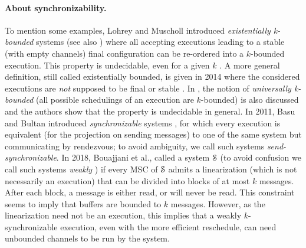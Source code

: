 \documentclass[a4paper,UKenglish,cleveref, autoref, thm-restate]{lipics-v2021}
\begin{document}
\paragraph*{About synchronizability.}
To mention some examples, Lohrey and Mus\-choll introduced
\emph{existentially k-bounded} systems \cite{DBLP:journals/iandc/LohreyM04} (see
also \cite{DBLP:conf/fossacs/LohreyM02,DBLP:conf/dlt/GenestMK04,GKM07}) where
all accepting executions leading to a stable (with empty channels) final
configuration can be re-ordered into a $k$-bounded execution. This property is
undecidable, even for a given $k$ \cite{GKM07}. A  more general definition,
still called existentially bounded, is given in 2014 where the considered
executions are \emph{not} supposed to be final or stable
\cite{kuske2014communicating}. In  \cite{DBLP:journals/iandc/LohreyM04,HENRIKSEN20051}, the notion of
\emph{universally k-bounded} (all possible schedulings of an execution are $k$-bounded) is also
discussed and the authors show that the property is undecidable in
general.
%
In 2011, Basu and Bultan introduced \emph{synchronizable} systems \cite{DBLP:conf/www/BasuB11}, for which every execution is equivalent (for the projection on sending messages)
to one of the same system but communicating by rendezvous; to avoid ambiguity, we call such systems \emph{send-synchronizable}.
%
In 2018, Bouajjani et al., called a system $\mathcal{S}$ \emph{} \cite{DBLP:conf/cav/BouajjaniEJQ18} (to avoid confusion %
we call such systems \emph{weakly }) if every MSC of $\mathcal{S}$
admits a linearization (which is not necessarily an execution) that can be divided into blocks of at most $k$ messages. After each block, a message is either read, or will never be read.
This constraint
seems to imply that buffers are bounded to $k$ messages.
 However,
as the linearization need not be an execution, this implies that a weakly $k$-synchronizable execution, even with the more efficient reschedule, can need unbounded channels to be run by the system.
\end{document}
